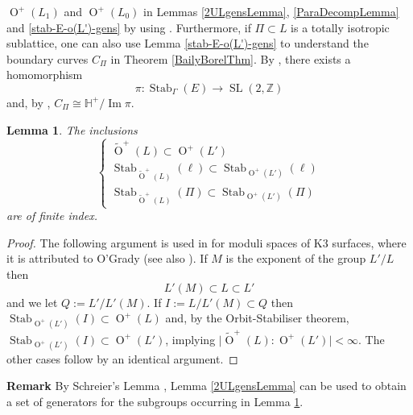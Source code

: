 \documentclass[12pt, a4paper]{article}
\newtheorem{lemma}[theorem]{Lemma}
\newcommand{\ZZ}{\mathbb{Z}}
\newcommand{\HH}{\mathbb{H}}
\newcommand{\beq}{\begin{equation*}}
\newcommand{\eeq}{\end{equation*}}
\newcommand{\opn}{\operatorname}
\newcommand{\ol}{\opn{O}^+(L)}
\newcommand{\old}{\opn{O}^+(L')}
\newcommand{\otl}{\widetilde{\opn{O}}^+(L)}
\begin{document}
$\opn{O}^+(L_1)$ and $\opn{O}^+(L_0)$ in Lemmas \ref{2ULgensLemma}, \ref{ParaDecompLemma} and \ref{stab-E-o(L')-gens} by using \cite{Mertens, Vinberg, FinckePohst}.
Furthermore, if $\Pi \subset L$ is a totally isotropic sublattice, one can also use Lemma \ref{stab-E-o(L')-gens} to understand the boundary curves $C_{\Pi}$ in Theorem \ref{BailyBorelThm}.
By \cite{Brieskorn}, there exists a homomorphism
\beq
\pi:\opn{Stab}_{\Gamma}(E) \rightarrow \opn{SL}(2, \ZZ)  
\eeq
and, by \cite[\S2]{Scattone}\cite[\S2]{Kondo}, $C_{\Pi} \cong \HH^+ / \opn{Im} \pi$.
\begin{lemma}\label{fin-index-lemma}
  The inclusions
  \beq
  \begin{cases}
    \otl \subset \old \\
    \opn{Stab}_{\otl}(\ell) \subset \opn{Stab}_{\old}(\ell) \\
    \opn{Stab}_{\otl}(\Pi) \subset \opn{Stab}_{\old}(\Pi)
  \end{cases}
  \eeq
    are of finite index.
\end{lemma}
\begin{proof}
  The following argument is used in \cite{Kondo} for moduli spaces of K3 surfaces, where it is attributed to O'Grady (see also \cite{DawesFamily}).
  If $M$ is the exponent of the group $L'/L$ then
  \beq
  L'(M) \subset L \subset L' 
  \eeq
  and we let $Q:=L'/L'(M)$.
  If $I := L /L'(M) \subset Q$ then $\opn{Stab}_{\old}(I) \subset \ol$ and, by the Orbit-Stabiliser theorem, $\opn{Stab}_{\old}(I) \subset \old$, implying $\vert \otl : \old \vert < \infty$. 
 The other cases follow by an identical argument.
\end{proof}
\noindent \textbf{Remark} By Schreier's Lemma \cite[p.18]{Cameron}, Lemma \ref{2ULgensLemma} can be used to obtain a set of generators for the subgroups occurring in Lemma \ref{fin-index-lemma}.
\end{document}
